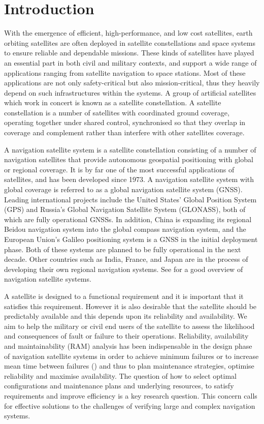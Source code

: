 \documentclass[preprint,12pt]{qrei}
\begin{document}
\section{Introduction}

With the emergence of efficient, high-performance, and low cost satellites, earth orbiting satellites are often deployed in satellite constellations and space systems to ensure reliable and dependable missions. These kinds of satellites have played an essential part in both civil and military contexts, and support a wide range of applications ranging from satellite navigation to space stations. Most of these applications are not only safety-critical but also mission-critical, thus they heavily depend on such infrastructures within the systems. A group of artificial satellites which work in concert is known as a satellite constellation. A satellite constellation is a number of satellites with coordinated ground coverage, operating together under shared control, synchronised so that they overlap in coverage and complement rather than interfere with other satellites coverage.

A navigation satellite system is a satellite constellation consisting of a number of navigation satellites that provide autonomous geospatial positioning with global or regional coverage. It is by far one of the most successful applications of satellites, and has been developed since 1973. A navigation satellite system with global coverage is referred to as a global navigation satellite system (GNSS). Leading international projects include the United States' Global Position System (GPS) and Russia's Global Navigation Satellite System (GLONASS), both of which are fully operational GNSSs. In addition, China is expanding its regional Beidou navigation system into the global compass navigation system, and the European Union's Galileo positioning system is a GNSS in the initial deployment phase. Both of these systems are planned to be fully operational in the next decade. Other countries such as India, France, and Japan are in the process of developing their own regional navigation systems. See \cite{WLW07} for a good overview of navigation satellite systems.

A satellite is designed to a functional requirement and it is important that it satisfies this requirement. However it is also desirable that the satellite should be predictably available and this depends upon its reliability and availability. We aim to help the military or civil end users of the satellite to assess the likelihood and consequences of fault or failure to their operations. Reliability, availability and maintainability (RAM) analysis has been indispensable in the design phase of navigation satellite systems in order to achieve minimum failures or to increase mean time between failures () and thus to plan maintenance strategies, optimise reliability and maximise availability. The question of how to select optimal configurations and maintenance plans and underlying resources, to satisfy requirements and improve efficiency is a key research question. This concern calls for effective solutions to the challenges of verifying large and complex navigation systems.
\end{document}
